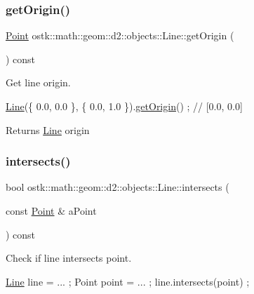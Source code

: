 \subsubsection{\texorpdfstring{get\+Origin()}{getOrigin()}}
{\footnotesize\ttfamily \hyperlink{classostk_1_1math_1_1geom_1_1d2_1_1objects_1_1_point}{Point} ostk\+::math\+::geom\+::d2\+::objects\+::\+Line\+::get\+Origin (\begin{DoxyParamCaption}{ }\end{DoxyParamCaption}) const}



Get line origin. 


\begin{DoxyCode}
\hyperlink{classostk_1_1math_1_1geom_1_1d2_1_1objects_1_1_line_aa1570ebec4d4f57cbed3c188e6b65613}{Line}(\{ 0.0, 0.0 \}, \{ 0.0, 1.0 \}).\hyperlink{classostk_1_1math_1_1geom_1_1d2_1_1objects_1_1_line_aa4c99f38ff7ac4e8fcfe90d9b2bcb0b9}{getOrigin}() ; \textcolor{comment}{// [0.0, 0.0]}
\end{DoxyCode}


\begin{DoxyReturn}{Returns}
\hyperlink{classostk_1_1math_1_1geom_1_1d2_1_1objects_1_1_line}{Line} origin 
\end{DoxyReturn}
\mbox{\label{classostk_1_1math_1_1geom_1_1d2_1_1objects_1_1_line_abb4e7785e861a1f7362684a3f3d81cb5}} 
\subsubsection{\texorpdfstring{intersects()}{intersects()}\hspace{0.1cm}{\footnotesize\ttfamily [1/2]}}
{\footnotesize\ttfamily bool ostk\+::math\+::geom\+::d2\+::objects\+::\+Line\+::intersects (\begin{DoxyParamCaption}\item[{const \hyperlink{classostk_1_1math_1_1geom_1_1d2_1_1objects_1_1_point}{Point} \&}]{a\+Point }\end{DoxyParamCaption}) const}



Check if line intersects point. 


\begin{DoxyCode}
\hyperlink{classostk_1_1math_1_1geom_1_1d2_1_1objects_1_1_line_aa1570ebec4d4f57cbed3c188e6b65613}{Line} line = ... ;
Point point = ... ;
line.intersects(point) ;
\end{DoxyCode}



